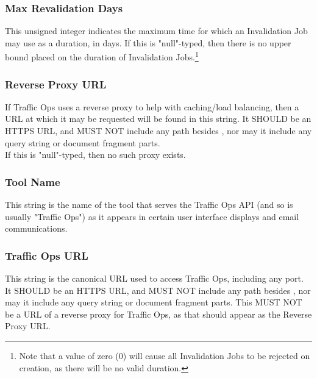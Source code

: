 \subsubsection{Max Revalidation Days}
This unsigned integer indicates the maximum time for which an Invalidation Job
may use as a duration, in days. If this is "null"-typed, then there is no
upper bound placed on the duration of Invalidation Jobs.\footnote{Note that a
value of zero ($0$) will cause all Invalidation Jobs to be rejected on creation,
as there will be no valid duration.}

\subsubsection{Reverse Proxy URL}
If Traffic Ops uses a reverse proxy to help with caching/load balancing, then a
URL at which it may be requested will be found in this string. It SHOULD be an
HTTPS URL, and MUST NOT include any path besides \code{/}, nor may it include
any query string or document fragment parts.\\
If this is "null"-typed, then no such proxy exists.

\subsubsection{Tool Name}
This string is the name of the tool that serves the Traffic Ops API (and so is
usually "Traffic Ops") as it appears in certain user interface displays and
email communications.

\subsubsection{Traffic Ops URL}
This string is the canonical URL used to access Traffic Ops, including any port.
It SHOULD be an HTTPS URL, and MUST NOT include any path besides \code{/}, nor
may it include any query string or document fragment parts. This MUST NOT be a
URL of a reverse proxy for Traffic Ops, as that should appear as the Reverse
Proxy URL.
